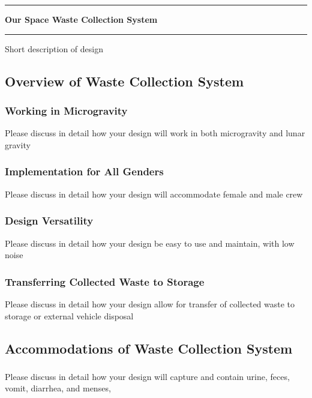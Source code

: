 \pagebreak
\chapter[Our Space Waste Collection System]{}\vspace{-2cm}\noindent\rule{\textwidth}{2.5pt}
\thispagestyle{empty}

\vspace{5cm}\textbf{\huge{Our Space Waste Collection System}}

\medskip\noindent\rule{\textwidth}{1pt}

Short description of design

\pagebreak
\section{Overview of Waste Collection System}

    \subsection{Working in Microgravity}
    Please discuss in detail how your design will work in both microgravity and lunar gravity

    \subsection{Implementation for All Genders}
    Please discuss in detail how your design will accommodate female and male crew

    \subsection{Design Versatility}
    Please discuss in detail how your design be easy to use and maintain, with low noise

    \subsection{Transferring Collected Waste to Storage}
    Please discuss in detail how your design allow for transfer of collected waste to storage or external vehicle disposal

\pagebreak
\section{Accommodations of Waste Collection System}

    \subsection{}
    Please discuss in detail how your design will capture and contain urine, feces, vomit, diarrhea, and menses,

